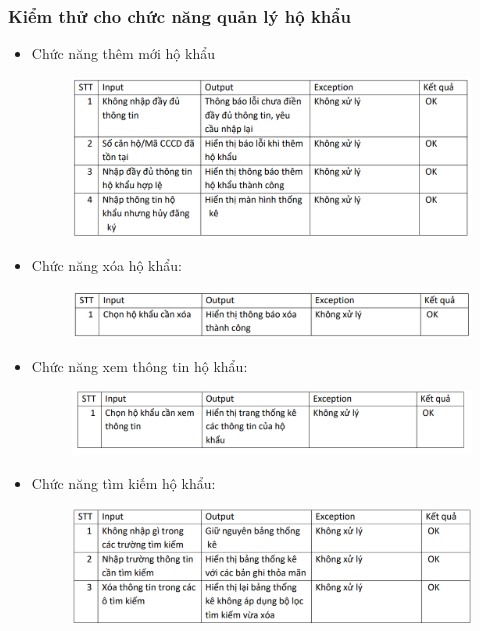 \documentclass{article}
\begin{document}
\subsubsection{Kiểm thử cho chức năng quản lý hộ khẩu}
\begin{itemize}
    \item Chức năng thêm mới hộ khẩu
    \begin{figure}[H]
        \centering
        \includegraphics[width=1\textwidth]{Kiểm thử/KT thêm hộ khẩu.png}
    \end{figure}
    \item Chức năng xóa hộ khẩu:
    \begin{figure}[H]
        \centering
        \includegraphics[width=1\textwidth]{Kiểm thử/KT xóa hộ khẩu.png}
    \end{figure}
    \item Chức năng xem thông tin hộ khẩu:
    \begin{figure}[H]
        \centering
        \includegraphics[width=1\textwidth]{Kiểm thử/KT xem thông tin hộ.png}
    \end{figure}
    \item Chức năng tìm kiếm hộ khẩu:
    \begin{figure}[H]
        \centering
        \includegraphics[width=1\textwidth]{Kiểm thử/KT tìm hộ khẩu.png}

\end{figure}
\end{itemize}
\end{document}
